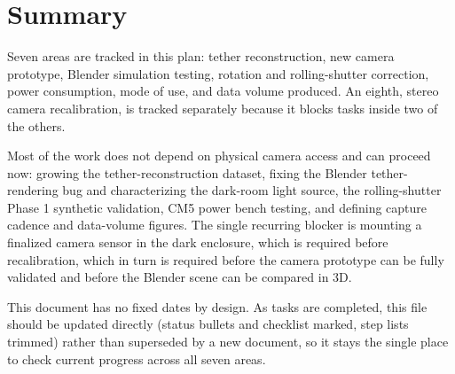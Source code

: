 \chapter{Summary}

Seven areas are tracked in this plan: tether reconstruction, new camera prototype, Blender simulation testing, rotation and rolling-shutter correction, power consumption, mode of use, and data volume produced. An eighth, stereo camera recalibration, is tracked separately because it blocks tasks inside two of the others.

Most of the work does not depend on physical camera access and can proceed now: growing the tether-reconstruction dataset, fixing the Blender tether-rendering bug and characterizing the dark-room light source, the rolling-shutter Phase 1 synthetic validation, CM5 power bench testing, and defining capture cadence and data-volume figures. The single recurring blocker is mounting a finalized camera sensor in the dark enclosure, which is required before recalibration, which in turn is required before the camera prototype can be fully validated and before the Blender scene can be compared in 3D.

This document has no fixed dates by design. As tasks are completed, this file should be updated directly (status bullets and checklist marked, step lists trimmed) rather than superseded by a new document, so it stays the single place to check current progress across all seven areas.
